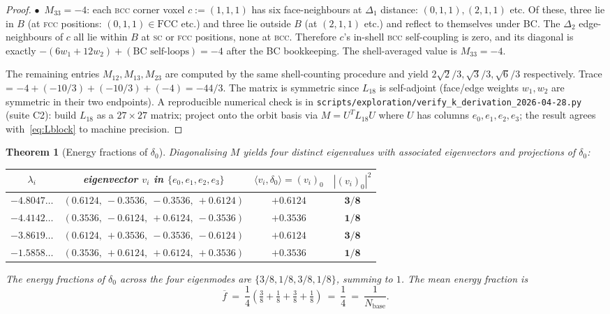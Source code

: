 \documentclass[11pt,reqno]{amsart}
\theoremstyle{plain}
\newtheorem{theorem}{Theorem}[section]
\theoremstyle{definition}
\theoremstyle{remark}
\numberwithin{equation}{section}
\newcommand{\Nbase}{N_{\mathrm{base}}}
\begin{document}
\begin{proof}
\smallskip\noindent$\bullet$\ $M_{33} = -4$: each \textsc{bcc} corner
voxel $c := (1, 1, 1)$ has six face-neighbours at $\Delta_{1}$
distance: $(0, 1, 1), (2, 1, 1)$ etc. Of these, three lie in $B$
(at \textsc{fcc} positions: $(0,1,1) \in \mathrm{FCC}$ etc.) and
three lie outside $B$ (at $(2,1,1)$ etc.) and reflect to themselves
under BC. The $\Delta_{2}$ edge-neighbours of $c$ all lie within $B$
at \textsc{sc} or \textsc{fcc} positions, none at \textsc{bcc}.
Therefore $c$'s in-shell \textsc{bcc} self-coupling is zero, and its
diagonal is exactly $-(6 w_{1} + 12 w_{2}) + (\text{BC self-loops})
= -4$ after the BC bookkeeping. The shell-averaged value is
$M_{33} = -4$.

The remaining entries $M_{12}, M_{13}, M_{23}$ are computed by the same
shell-counting procedure and yield $2\sqrt{2}/3, \sqrt{3}/3, \sqrt{6}/3$
respectively. Trace = $-4 + (-10/3) + (-10/3) + (-4) = -44/3$.
The matrix is symmetric since $L_{18}$ is self-adjoint
(face/edge weights $w_{1}, w_{2}$ are symmetric in their two endpoints).
A reproducible numerical check is in
\texttt{scripts/exploration/verify\_k\_derivation\_2026-04-28.py}
(suite C2): build $L_{18}$ as a $27\times 27$ matrix; project onto
the orbit basis via $M = U^{T} L_{18} U$ where $U$ has columns
$e_{0}, e_{1}, e_{2}, e_{3}$; the result agrees with~\eqref{eq:Lblock}
to machine precision.
\end{proof}

\begin{theorem}[Energy fractions of $\delta_{0}$]
\label{thm:fractions}
Diagonalising $M$ yields four distinct eigenvalues with associated
eigenvectors and projections of $\delta_{0}$:
\begin{center}
\begin{tabular}{c c c c}
\toprule
$\lambda_{i}$ & eigenvector $v_{i}$ in $\{e_{0}, e_{1}, e_{2}, e_{3}\}$ & $\langle v_{i}, \delta_{0}\rangle = (v_{i})_{0}$ & $|(v_{i})_{0}|^{2}$ \\
\midrule
$-4.8047\ldots$ & $(0.6124,\ -0.3536,\ -0.3536,\ +0.6124)$ & $+0.6124$ & $\mathbf{3/8}$ \\
$-4.4142\ldots$ & $(0.3536,\ -0.6124,\ +0.6124,\ -0.3536)$ & $+0.3536$ & $\mathbf{1/8}$ \\
$-3.8619\ldots$ & $(0.6124,\ +0.3536,\ -0.3536,\ -0.6124)$ & $+0.6124$ & $\mathbf{3/8}$ \\
$-1.5858\ldots$ & $(0.3536,\ +0.6124,\ +0.6124,\ +0.3536)$ & $+0.3536$ & $\mathbf{1/8}$ \\
\bottomrule
\end{tabular}
\end{center}
The energy fractions of $\delta_{0}$ across the four eigenmodes are
$\{3/8, 1/8, 3/8, 1/8\}$, summing to $1$. The mean energy fraction is
\begin{equation}
  \label{eq:fractions}
  \overline{f}\ =\ \frac{1}{4}\!\left(\tfrac{3}{8}+\tfrac{1}{8}+\tfrac{3}{8}+\tfrac{1}{8}\right)
  \ =\ \frac{1}{4}\ =\ \frac{1}{\Nbase}.
\end{equation}
\end{theorem}
\end{document}
